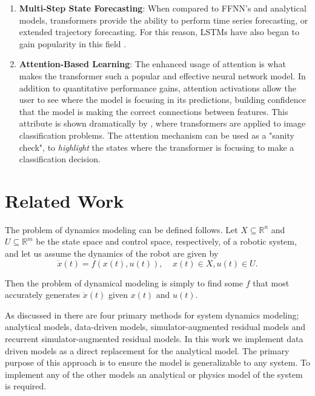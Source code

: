 \documentclass[letterpaper, 10 pt, conference]{ieeeconf}  %
\newcommand{\ap}[1]{{\color{purple}AP:#1} }
\begin{document}
\begin{enumerate}
    \item \textbf{Multi-Step State Forecasting}: When compared to FFNN's and analytical models, transformers provide the ability to perform time series forecasting, or extended trajectory forecasting. For this reason, LSTMs have also began to gain popularity in this field \cite{cao2019financial, sagheer2019time}. 
    \item \textbf{Attention-Based Learning}: The enhanced usage of attention is what makes the transformer such a popular and effective neural network model. In addition to quantitative performance gains, attention activations allow the user to see where the model is focusing in its predictions, building confidence that the model is making the correct connections between features. This attribute is shown dramatically by \cite{Image_tx_Dosovitskiy}, where transformers are applied to image classification problems. The attention mechanism can be used as a "sanity check", to \emph{highlight} the states where the transformer is focusing to make a classification decision. 
\end{enumerate}

\section{Related Work}
The problem of dynamics modeling can be defined follows. Let $X \subseteq 	\mathbb{R}^n$ and $U \subseteq \mathbb{R}^m$ be the state space and control space, respectively, of a robotic system, and let us assume the dynamics of the robot are given by 
\begin{equation}
\dot{x}(t) = f(x(t),u(t)), \ \ \ \ \ x(t) \in X, u(t)  \in U.
\end{equation}

\noindent Then the problem of dynamical modeling is simply to find some $f$ that most accurately generates $\dot{x}(t)$ given $x(t)$ and $u(t)$.

As discussed in \cite{Anurag2018DynamicalModels, bear2021DynamicsModels} there are four primary methods for system dynamics modeling; analytical models, data-driven models, simulator-augmented residual models and recurrent simulator-augmented residual models. In this work we implement data driven models as a direct replacement for the analytical model. The primary purpose of this approach is to ensure the model is generalizable to any system. To implement any of the other models an analytical or physics model of the system is required.
\end{document}
